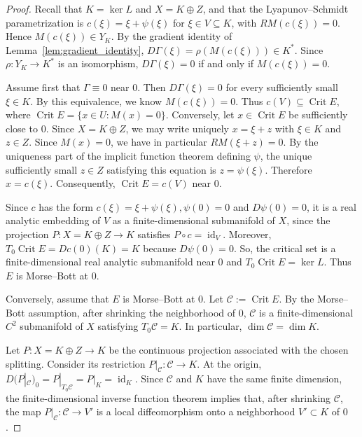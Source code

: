 \documentclass[10pt,a4paper]{amsart}
\begin{document}
\begin{proof}
Recall that $K = \ker L$ and $X = K \oplus Z$, and that the Lyapunov--Schmidt parametrization is
$c(\xi) = \xi + \psi(\xi)$ for  $\xi \in V \subseteq K$, with $R M(c(\xi)) = 0$. 
Hence $M(c(\xi)) \in Y_K$. By the gradient identity of Lemma~\ref{lem:gradient_identity},
$D\Gamma(\xi) = \rho(M(c(\xi))) \in K^*$. 
Since $\rho:Y_K\to K^*$ is an isomorphism, $D\Gamma(\xi)=0$ if and only if $M(c(\xi))=0$.

\medskip
Assume first that $\Gamma \equiv 0$ near $0$. Then $D\Gamma(\xi) = 0$ for every sufficiently small $\xi \in K$. By this equivalence,
we know $M(c(\xi)) = 0$. Thus $c(V) \subseteq \operatorname{Crit}E$, where $\operatorname{Crit}E = \{x \in U : M(x) = 0\}$.
Conversely, let $x \in \operatorname{Crit}E$ be sufficiently close to $0$. Since $X=K\oplus Z$, we may write uniquely $x=\xi+z$ with $\xi\in K$ and $z\in Z$.
Since $M(x) = 0$, we have in particular $R M(\xi + z) = 0$. 
By the uniqueness part of the implicit function theorem defining $\psi$, the unique sufficiently small $z \in Z$ satisfying this equation is
$z = \psi(\xi)$. Therefore $x = c(\xi)$. Consequently, $\operatorname{Crit}E = c(V)$ near $0$.

\smallskip
Since $c$ has the form $c(\xi) = \xi + \psi(\xi),  \psi(0) = 0$ and $D\psi(0) = 0$, 
it is a real analytic embedding of $V$ as a finite-dimensional submanifold of $X$, since the projection $P:X=K\oplus Z\to K$ satisfies $P\circ c=\operatorname{id}_V$. Moreover, $T_0\operatorname{Crit}E=Dc(0)(K)=K$ because $D\psi(0)=0$.
So, the critical set is a finite-dimensional real analytic submanifold near $0$ and
$T_0 \operatorname{Crit}E = \ker L$. Thus $E$ is Morse--Bott at $0$.

\medskip
Conversely, assume that $E$ is Morse--Bott at $0$. Let $\mathcal{C} := \operatorname{Crit}E$. 
By the Morse--Bott assumption, after shrinking the neighborhood of $0$, $\mathcal{C}$ is a finite-dimensional $C^2$ submanifold of $X$ satisfying
$T_0 \mathcal{C} = K$. In particular, $\dim \mathcal{C} = \dim K$.

\medskip
Let $P : X = K \oplus Z \longrightarrow K$
be the continuous projection associated with the chosen splitting. Consider its restriction
$P|_{\mathcal{C}} : \mathcal{C} \longrightarrow K$. At the origin, $D(P|_{\mathcal C})_0=P|_{T_0\mathcal C}=P|_K=\operatorname{id}_K$.
Since $\mathcal{C}$ and $K$ have the same finite dimension, the finite-dimensional inverse function theorem implies that, after shrinking $\mathcal{C}$, the map
$P|_{\mathcal{C}} : \mathcal{C} \longrightarrow V'$
is a local diffeomorphism onto a neighborhood $V' \subset K$ of $0$.


\end{proof}
\end{document}
